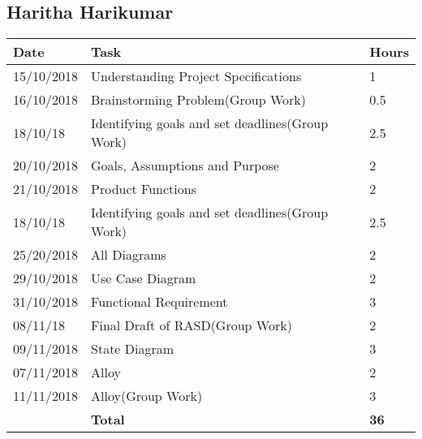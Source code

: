\subsection{Haritha Harikumar}
\begin{table}[H]
	\centering
    \begin{tabular}{|l|l|l|}
    \hline
     \textbf{Date} & \textbf{Task} &\textbf{ Hours}\\
    \hline
    15/10/2018 & Understanding Project Specifications & 1\\
    \hline
    16/10/2018 & Brainstorming Problem(Group Work) & 0.5\\
    \hline
    18/10/18 & Identifying goals and set deadlines(Group Work) & 2.5\\
    \hline
    20/10/2018 & Goals, Assumptions and Purpose & 2\\
    \hline
    21/10/2018 & Product Functions & 2\\
    \hline
    18/10/18 & Identifying goals and set deadlines(Group Work) & 2.5\\
    \hline
    25/20/2018 & All Diagrams & 2\\
    \hline
    29/10/2018 & Use Case Diagram & 2\\
    \hline
    31/10/2018 & Functional Requirement & 3\\
    \hline
    08/11/18 &	Final Draft of RASD(Group Work) &	2\\
    \hline
    09/11/2018 & State Diagram & 3\\
    \hline
    07/11/2018 & Alloy & 2\\
    \hline
    11/11/2018 & Alloy(Group Work) & 3\\
    \hline
    & \textbf{Total}	& \textbf{36}\\
    \hline
    \end{tabular}
\end{table}


